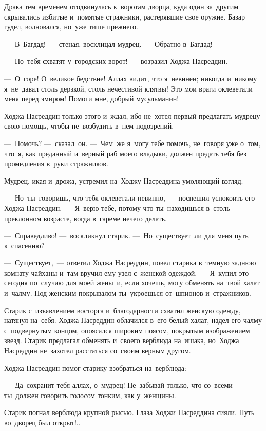 \documentclass[12pt,a4paper]{book}
\begin{document}
Драка тем временем отодвинулась к~воротам дворца, куда один за~другим скрывались избитые и~помятые стражники, растерявшие свое оружие. Базар гудел, волновался, но~уже тише прежнего.

—~В~Багдад! —~стеная, восклицал мудрец. —~Обратно в~Багдад!

—~Но~тебя схватят у~городских ворот! —~возразил Ходжа Насреддин.

—~О~горе! О~великое бедствие! Аллах видит, что я~невинен; никогда и~никому я~не~давал столь дерзкой, столь нечестивой клятвы! Это мои враги оклеветали меня перед эмиром! Помоги мне, добрый мусульманин!

Ходжа Насреддин только этого и~ждал, ибо не~хотел первый предлагать мудрецу свою помощь, чтобы не~возбудить в~нем подозрений.

—~Помочь? —~сказал~он. —~Чем~же я~могу тебе помочь, не~говоря уже о~том, что~я, как преданный и~верный раб моего владыки, должен предать тебя без промедления в~руки стражников.

Мудрец, икая и~дрожа, устремил на~Ходжу Насреддина умоляющий взгляд.

—~Но~ты~говоришь, что тебя оклеветали невинно,~— поспешил успокоить его Ходжа Насреддин. —~Я~верю тебе, потому что ты~находишься в~столь преклонном возрасте, когда в~гареме нечего делать.

—~Справедливо! —~воскликнул старик. —~Но~существует~ли для меня путь к~спасению?

—~Существует,~— ответил Ходжа Насреддин, повел старика в~темную заднюю комнату чайханы и~там вручил ему узел с~женской одеждой. —~Я~купил это сегодня по~случаю для моей жены~и, если хочешь, могу обменять на~твой халат и~чалму. Под женским покрывалом ты~укроешься от~шпионов и~стражников.

Старик с~изъявлением восторга и~благодарности схватил женскую одежду, натянул на~себя. Ходжа Насреддин облачился в~его белый халат, надел его чалму с~подвернутым концом, опоясался широким поясом, покрытым изображением звезд. Старик предлагал обменять и~своего верблюда на~ишака, но~Ходжа Насреддин не~захотел расстаться со~своим верным другом.

Ходжа Насреддин помог старику взобраться на~верблюда:

—~Да~сохранит тебя аллах, о~мудрец! Не~забывай только, что со~всеми ты~должен говорить голосом тонким, как у~женщины.

Старик погнал верблюда крупной рысью. Глаза Ходжи Насреддина сияли. Путь во~дворец был открыт!..
\end{document}
